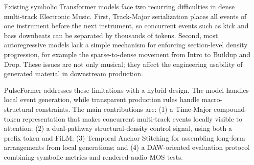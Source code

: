 \documentclass[conference]{conference-latex-template_10-17-19/IEEEtran}
\begin{document}
Existing symbolic Transformer models \cite{vaswani2017attention,hsiao2021compound,ens2020mmm} face two recurring difficulties in dense multi-track Electronic Music. First, Track-Major serialization places all events of one instrument before the next instrument, so concurrent events such as kick and bass downbeats can be separated by thousands of tokens. Second, most autoregressive models lack a simple mechanism for enforcing section-level density progression, for example the sparse-to-dense movement from Intro to Buildup and Drop. These issues are not only musical; they affect the engineering usability of generated material in downstream production.

PulseFormer addresses these limitations with a hybrid design. The model handles local event generation, while transparent production rules handle macro-structural constraints. The main contributions are: (1) a Time-Major compound-token representation that makes concurrent multi-track events locally visible to attention; (2) a dual-pathway structural-density control signal, using both a prefix token and FiLM; (3) Temporal Anchor Stitching for assembling long-form arrangements from local generations; and (4) a DAW-oriented evaluation protocol combining symbolic metrics and rendered-audio MOS tests.
\end{document}
